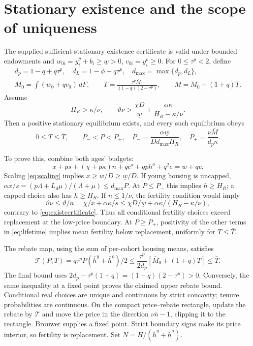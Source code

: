 \documentclass[11pt]{article}
\newcommand{\dd}{\,d}
\newcommand{\HH}{\bar H}
\newcommand{\tht}{\vartheta}
\begin{document}
\section{Stationary existence and the scope of uniqueness}\label{app:existence}
The supplied sufficient stationary existence certificate is valid under bounded endowments and $w_{0i}=y_i^y+b_i\ge\underline w>0$, $v_{0i}=y_i^o\ge0$. For $0\le\tau^p<2$, define
\[
 \begin{gathered}
 d_p=1-q+q\tau^p,\quad d_L=1-\phi+q\tau^p,\quad d_{\max}=\max\{d_p,d_L\},\\
 \bar M_0=\int(w_0+qv_0)\dd F,\qquad
 \bar T=\frac{\tau^p\bar M_0}{(1-q)(2-\tau^p)},\qquad
 \bar M=\bar M_0+(1+q)\bar T.
 \end{gathered}
\]
Assume
\begin{equation}
 H_R>\kappa/\nu,\qquad
 \tht\nu>\frac{\chi D}{\underline w}
       +\frac{\alpha\kappa}{H_R-\kappa/\nu}.\label{eq:existcertificate}
\end{equation}
Then a positive stationary equilibrium exists, and every such equilibrium obeys
\begin{equation}
 0\le T\le\bar T,\qquad
 P_-<P<P_+,\quad
 P_- =\frac{\alpha\underline w}{D d_{\max}H_R},\quad
 P_+=\frac{\nu\bar M}{d_p\kappa}.\label{eq:pricecertificate}
\end{equation}

To prove this, combine both ages' budgets:
\begin{equation}
 x+ps+(\chi+p\kappa)n+qc^o+qph^o+q^2e=w+qv.\label{eq:lifetime}
\end{equation}
Scaling \eqref{eq:scaling} implies $x\ge w/D\ge\underline w/D$. If young housing is uncapped,
$\alpha x/s=(p\Lambda+L_d\mu)/(\Lambda+\mu)\le d_{\max}P$.
At $P\le P_-$ this implies $h\ge H_R$; a capped choice also has $h\ge H_R$. If $n\le1/\nu$, the fertility condition would imply
\[
 \tht\nu\le\tht/n
 =\chi/x+\alpha\kappa/s
 \le\chi D/\underline w+\alpha\kappa/(H_R-\kappa/\nu),
\]
contrary to \eqref{eq:existcertificate}. Thus all conditional fertility choices exceed replacement at the low-price boundary. At $P\ge P_+$, positivity of the other terms in \eqref{eq:lifetime} implies mean fertility below replacement, uniformly for $T\le\bar T$.

The rebate map, using the sum of per-cohort housing means, satisfies
\[
 \mathcal T(P,T)=q\tau^pP(\bar h^y+\bar h^o)/2
 \le\frac{\tau^p}{2d_p}[\bar M_0+(1+q)T]\le\bar T.
\]
The final bound uses $2d_p-\tau^p(1+q)=(1-q)(2-\tau^p)>0$. Conversely, the same inequality at a fixed point proves the claimed upper rebate bound. Conditional real choices are unique and continuous by strict concavity; tenure probabilities are continuous. On the compact price--rebate rectangle, update the rebate by $\mathcal T$ and move the price in the direction $\nu\bar n-1$, clipping it to the rectangle. Brouwer supplies a fixed point. Strict boundary signs make its price interior, so fertility is replacement. Set $N=\HH/(\bar h^y+\bar h^o)$.
\end{document}
